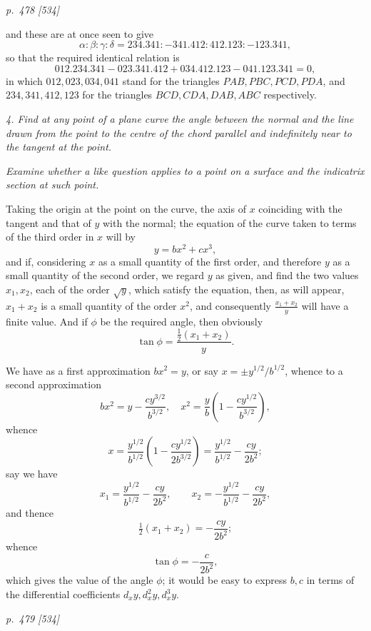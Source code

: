 \documentclass[11pt,a4paper]{article}
\theoremstyle{plain}
\theoremstyle{definition}
\newcommand{\sect}[1]{\medskip\noindent\textit{#1}}
\newcommand{\half}{\tfrac12}
\begin{document}
\bigskip
\textit{p.~478 [534]}
\smallskip

\noindent
and these are at once seen to give
\[
        \alpha:\beta:\gamma:\delta
        =234.341:-341.412:412.123:-123.341,
\]
so that the required identical relation is
\[
012.234.341-023.341.412+034.412.123-041.123.341=0,
\]
in which $012,023,034,041$ stand for the triangles $PAB,PBC,PCD,PDA$, and
$234,341,412,123$ for the triangles $BCD,CDA,DAB,ABC$ respectively.

\sect{4. Find at any point of a plane curve the angle between the normal and the
line drawn from the point to the centre of the chord parallel and indefinitely near
to the tangent at the point.}

\sect{Examine whether a like question applies to a point on a surface and the
indicatrix section at such point.}

Taking the origin at the point on the curve, the axis of $x$ coinciding with the
tangent and that of $y$ with the normal; the equation of the curve taken to terms
of the third order in $x$ will by
\[
        y=bx^2+cx^3,
\]
and if, considering $x$ as a small quantity of the first order, and therefore $y$ as
a small quantity of the second order, we regard $y$ as given, and find the two
values $x_1,x_2$, each of the order $\sqrt y$, which satisfy the equation, then, as
will appear, $x_1+x_2$ is a small quantity of the order $x^2$, and consequently
$\frac{x_1+x_2}{y}$ will have a finite value. And if $\phi$ be the required angle,
then obviously
\[
        \tan\phi=\frac{\half(x_1+x_2)}{y}.
\]

We have as a first approximation $bx^2=y$, or say $x=\pm y^{1/2}/b^{1/2}$,
whence to a second approximation
\[
bx^2=y-\frac{cy^{3/2}}{b^{3/2}},\quad
x^2=\frac{y}{b}\left(1-\frac{cy^{1/2}}{b^{3/2}}\right),
\]
whence
\[
x=\frac{y^{1/2}}{b^{1/2}}\left(1-\frac{cy^{1/2}}{2b^{3/2}}\right)
=\frac{y^{1/2}}{b^{1/2}}-\frac{cy}{2b^2};
\]
say we have
\[
x_1=\frac{y^{1/2}}{b^{1/2}}-\frac{cy}{2b^2},\qquad
x_2=-\frac{y^{1/2}}{b^{1/2}}-\frac{cy}{2b^2},
\]
and thence
\[
        \half(x_1+x_2)=-\frac{cy}{2b^2};
\]
whence
\[
        \tan\phi=-\frac{c}{2b^2},
\]
which gives the value of the angle $\phi$; it would be easy to express $b,c$ in
terms of the differential coefficients $d_x y,d_x^2y,d_x^3y$.

\clearpage

\bigskip
\textit{p.~479 [534]}
\smallskip
\end{document}
